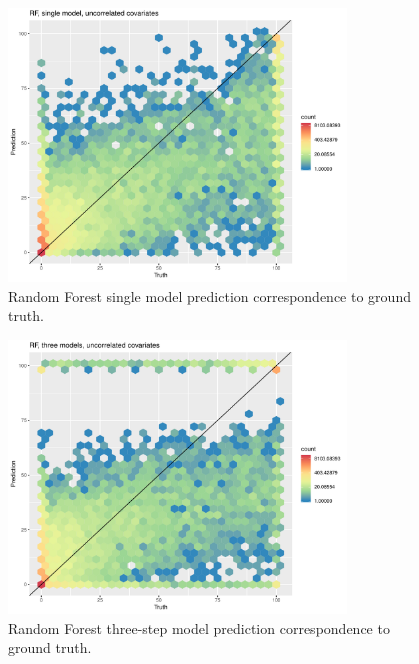 \documentclass[a4paper,10pt]{article}
\begin{document}
\begin{figure}
    \includegraphics[width=0.8\textwidth]{article-figures/hexplots/2019-03-22-rf-1m-uncor-hex}
    \caption{Random Forest single model prediction correspondence to ground truth.}
    \label{hex-rf-1m-uncor}
\end{figure}
\begin{figure}
    \includegraphics[width=0.8\textwidth]{article-figures/hexplots/2019-03-22-rf-3m-uncor-hex}
    \caption{Random Forest three-step model prediction correspondence to ground truth.}
    \label{hex-rf-3m-uncor}
\end{figure}
\end{document}
